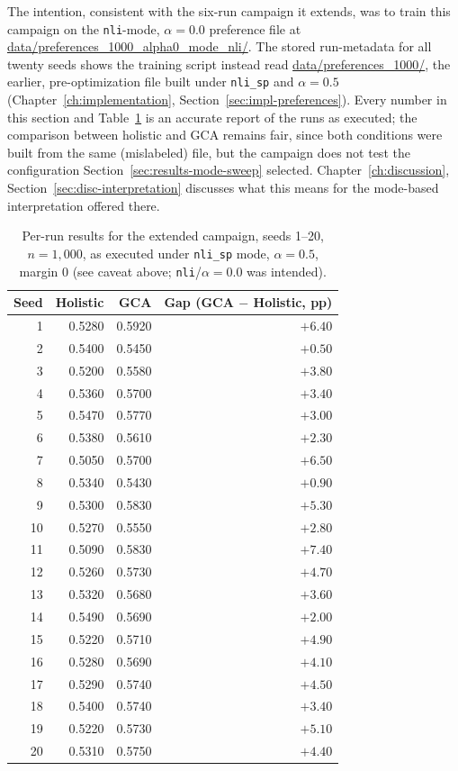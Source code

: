 \begin{caveat}
The intention, consistent with the six-run campaign it extends, was to
train this campaign on the \texttt{nli}-mode, $\alpha=0.0$ preference file
at \url{data/preferences_1000_alpha0_mode_nli/}. The stored run-metadata for
all twenty seeds shows the training script instead read
\url{data/preferences_1000/}, the earlier, pre-optimization file built under
\texttt{nli\_sp} and $\alpha=0.5$ (Chapter~\ref{ch:implementation},
Section~\ref{sec:impl-preferences}). Every number in this section and
Table~\ref{tab:seed-campaign-full} is an accurate report of the runs as
executed; the comparison between holistic and GCA remains fair, since both
conditions were built from the same (mislabeled) file, but the campaign
does not test the configuration Section~\ref{sec:results-mode-sweep}
selected. Chapter~\ref{ch:discussion}, Section~\ref{sec:disc-interpretation}
discusses what this means for the mode-based interpretation offered there.
\end{caveat}

\begin{table}[htbp]
\centering
\caption[Per-run results, extended twenty-run campaign]{Per-run results for the extended campaign, seeds 1--20,
$n=1{,}000$, as executed under \texttt{nli\_sp} mode, $\alpha=0.5$, margin 0
(see caveat above; \texttt{nli}/$\alpha=0.0$ was intended).}
\label{tab:seed-campaign-full}
\begin{tabular}{rrrr}
\toprule
Seed & Holistic & GCA & Gap (GCA $-$ Holistic, pp) \\
\midrule
1  & 0.5280 & 0.5920 & $+6.40$ \\
2  & 0.5400 & 0.5450 & $+0.50$ \\
3  & 0.5200 & 0.5580 & $+3.80$ \\
4  & 0.5360 & 0.5700 & $+3.40$ \\
5  & 0.5470 & 0.5770 & $+3.00$ \\
6  & 0.5380 & 0.5610 & $+2.30$ \\
7  & 0.5050 & 0.5700 & $+6.50$ \\
8  & 0.5340 & 0.5430 & $+0.90$ \\
9  & 0.5300 & 0.5830 & $+5.30$ \\
10 & 0.5270 & 0.5550 & $+2.80$ \\
11 & 0.5090 & 0.5830 & $+7.40$ \\
12 & 0.5260 & 0.5730 & $+4.70$ \\
13 & 0.5320 & 0.5680 & $+3.60$ \\
14 & 0.5490 & 0.5690 & $+2.00$ \\
15 & 0.5220 & 0.5710 & $+4.90$ \\
16 & 0.5280 & 0.5690 & $+4.10$ \\
17 & 0.5290 & 0.5740 & $+4.50$ \\
18 & 0.5400 & 0.5740 & $+3.40$ \\
19 & 0.5220 & 0.5730 & $+5.10$ \\
20 & 0.5310 & 0.5750 & $+4.40$ \\
\bottomrule
\end{tabular}
\end{table}


